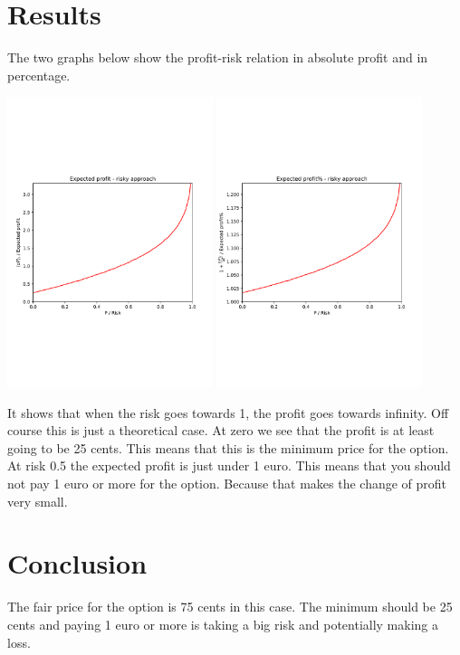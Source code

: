 \documentclass[8 pt]{article}
\begin{document}
\section{Results}
The two graphs below show the profit-risk relation in absolute profit and in percentage.
\begin{center}
  \includegraphics[width=0.45\textwidth]{graphs/P-oP.pdf}
  \includegraphics[width=0.45\textwidth]{graphs/P-Profit.pdf}
\end{center}
It shows that when the risk goes towards 1, the profit goes towards infinity. Off course this is just a theoretical case. At zero we see that the profit is at least going to be 25 cents. This means that this is the minimum price for the option. At risk 0.5 the expected profit is just under 1 euro. This means that you should not pay 1 euro or more for the option. Because that makes the change of profit very small. 

\section{Conclusion}
The fair price for the option is 75 cents in this case. The minimum should be 25 cents and paying 1 euro or more is taking a big risk and potentially making a loss.
\end{document}
